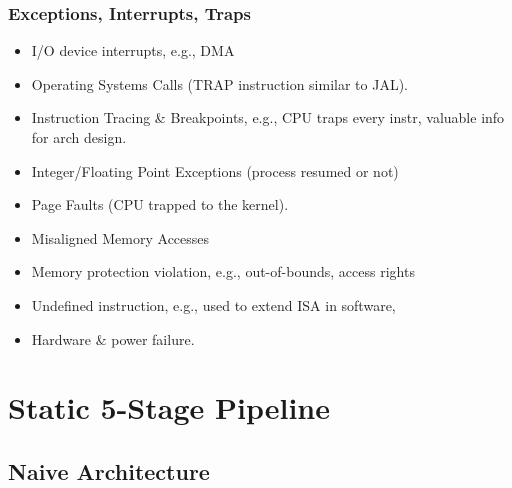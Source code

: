 \documentclass{beamer}
\begin{document}
\begin{frame}[fragile,t]
\frametitle{Exceptions, Interrupts, Traps}

\begin{itemize}
\item I/O device interrupts, e.g., DMA\smallskip
\item Operating Systems Calls (TRAP instruction similar to JAL).\smallskip
\item Instruction Tracing \& Breakpoints, e.g., CPU traps every instr,
        valuable info for arch design.\smallskip 
\item Integer/Floating Point Exceptions (process resumed or not)\smallskip
\item Page Faults (CPU trapped to the kernel).\smallskip
\item Misaligned Memory Accesses\smallskip
\item Memory protection violation, e.g., out-of-bounds, access rights\smallskip
\item Undefined instruction, e.g., used to extend ISA in software,\smallskip
\item Hardware \& power failure.
\end{itemize}

\end{frame}


\section{Static 5-Stage Pipeline}

\begin{frame}[fragile]
	\tableofcontents[currentsection]
\end{frame}


\subsection{Naive Architecture}
\end{document}
